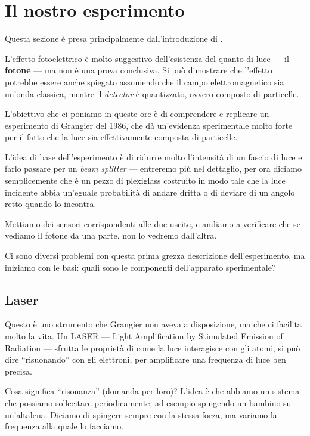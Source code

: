 \documentclass[a4paper,12pt]{article}
\begin{document}
\section{Il nostro esperimento}

Questa sezione è presa principalmente dall'introduzione di \textcite{thornObservingQuantumBehavior2004}.

L'effetto fotoelettrico è molto suggestivo dell'esistenza del quanto di luce --- il \textbf{fotone} --- ma non è una prova conclusiva. Si può dimostrare che l'effetto potrebbe essere anche spiegato assumendo che il campo elettromagnetico sia un'onda classica, mentre il \emph{detector} è quantizzato, ovvero composto di particelle.

L'obiettivo che ci poniamo in queste ore è di comprendere e replicare un esperimento di Grangier del 1986, che dà un'evidenza sperimentale molto forte per il fatto che la luce sia effettivamente composta di particelle.

L'idea di base dell'esperimento è di ridurre molto l'intensità di un fascio di luce e farlo passare per un \emph{beam splitter} --- entreremo più nel dettaglio, per ora diciamo semplicemente che è un pezzo di plexiglass costruito in modo tale che la luce incidente abbia un'eguale probabilità di andare dritta o di deviare di un angolo retto quando lo incontra.

Mettiamo dei sensori corrispondenti alle due uscite, e andiamo a verificare che se vediamo il fotone da una parte, non lo vedremo dall'altra.

Ci sono diversi problemi con questa prima grezza descrizione dell'esperimento, ma iniziamo con le basi: quali sono le componenti dell'apparato sperimentale?

\subsection{Laser}

Questo è uno strumento che Grangier non aveva a disposizione, ma che ci facilita molto la vita. 
Un LASER --- Light Amplification by Stimulated Emission of Radiation --- sfrutta le proprietà di come la luce interagisce con gli atomi, si può dire ``risuonando'' con gli elettroni, per amplificare una frequenza di luce ben precisa.

Cosa significa ``risonanza'' (domanda per loro)? 
L'idea è che abbiamo un sistema che possiamo sollecitare periodicamente, ad esempio spingendo un bambino su un'altalena.
Diciamo di spingere sempre con la stessa forza, ma variamo la frequenza alla quale lo facciamo.
\end{document}
